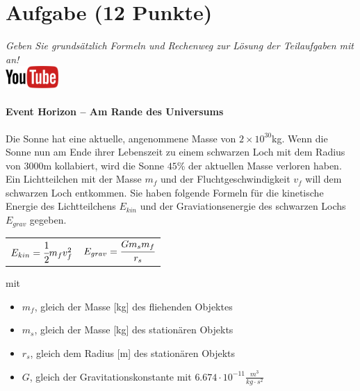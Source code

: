 \documentclass[a4paper, 10pt]{scrartcl}\usepackage[]{graphicx}\usepackage[]{xcolor}
\begin{document}
 
\clearpage

\section{Aufgabe \hfill (12 Punkte)}

\textit{Geben Sie grunds{\"a}tzlich Formeln und Rechenweg zur L{\"o}sung der
  Teilaufgaben mit an!} \\[1Ex]

\hfill\href{https://youtu.be/q-qYK4Chslg}{\includegraphics[width =
  2cm]{img/youtube}} %
\hspace{2Ex}

\paragraph{Event Horizon -- Am Rande des Universums}



Die Sonne hat eine aktuelle, angenommene Masse von
$\ensuremath{2\times 10^{30}}$kg. Wenn die Sonne nun am Ende ihrer Lebenszeit zu einem schwarzen Loch mit dem Radius
von $3000$m kollabiert, wird
die Sonne $45$\% der aktuellen Masse verloren haben. Ein
Lichtteilchen mit der Masse $m_f$ und der Fluchtgeschwindigkeit $v_f$ will
dem schwarzen Loch entkommen.  Sie haben folgende Formeln f{\"u}r die
kinetische Energie des Lichtteilchens $E_{kin}$ und der Graviationsenergie des
schwarzen Lochs $E_{grav}$ gegeben.

\begin{center}
  \begin{tabular}{cc}
    $E_{kin} = \cfrac{1}{2}m_fv_f^2$ & $E_{grav} = \cfrac{Gm_sm_f}{r_s}$\\
  \end{tabular}
\end{center}

mit

\begin{itemize}
\item $m_f$, gleich der Masse [kg] des fliehenden Objektes
\item $m_s$, gleich der Masse [kg] des station{\"a}ren Objekts
\item $r_s$, gleich dem Radius [m] des station{\"a}ren Objekts  
\item $G$, gleich der Gravitationskonstante mit $6.674 \cdot 10^{-11}
  \tfrac{m^3}{kg \cdot s^2}$ 
\end{itemize}
\end{document}
